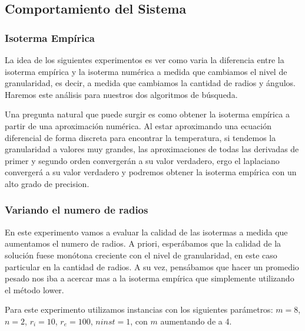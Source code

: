 \newpage
\subsection{Comportamiento del Sistema}

\subsubsection{Isoterma Empírica}

La idea de los siguientes experimentos es ver como varia la diferencia entre la isoterma empírica y la isoterma numérica a medida que cambiamos el nivel de granularidad, es decir, a medida que cambiamos la cantidad de radios y ángulos. Haremos este análisis para nuestros dos algoritmos de búsqueda.

Una pregunta natural que puede surgir es como obtener la isoterma empírica a partir de una aproximación numérica. Al estar aproximando una ecuación diferencial de forma discreta para encontrar la temperatura, si tendemos la granularidad a valores muy grandes, las aproximaciones de todas las derivadas de primer y segundo orden convergerán a su valor verdadero, ergo el laplaciano convergerá a su valor verdadero y podremos obtener la isoterma empírica con un alto grado de precision.

\subsubsection{Variando el numero de radios}

En este experimento vamos a evaluar la calidad de las isotermas a medida que aumentamos el numero de radios. A priori, esperábamos que la calidad de la solución fuese monótona creciente con el nivel de granularidad, en este caso particular en la cantidad de radios. A su vez, pensábamos que hacer un promedio pesado nos iba a acercar mas a la isoterma empírica que simplemente utilizando el método lower.

Para este experimento utilizamos instancias con los siguientes parámetros: $m = 8$, $n = 2$, $r_i = 10$, $r_e = 100$, $ninst = 1$, con $m$ aumentando de a 4. 

